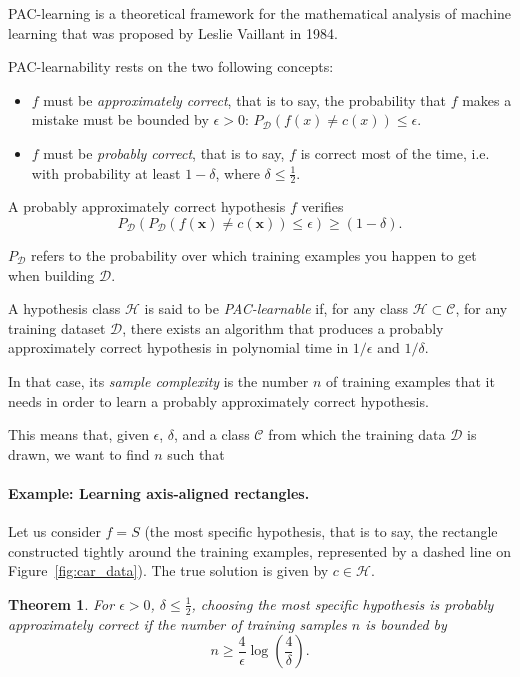 \documentclass[a4paper,12pt]{article}
\newcommand{\cc}{\mathcal{C}}
\newcommand{\dd}{\mathcal{D}}
\newcommand{\hh}{\mathcal{H}}
\newcommand{\xx}{{\bm x}}
\newtheorem*{thm}{Theorem}
\begin{document}
PAC-learning is a theoretical framework for the mathematical analysis of machine learning that was proposed by Leslie Vaillant in 1984. 

PAC-learnability rests on the two following concepts:
\begin{itemize}
\item $f$ must be {\em approximately correct}, that is to say, the probability that $f$ makes a mistake must be bounded by $\epsilon > 0$: 
$P_{\dd}(f(x) \neq c(x)) \leq \epsilon$.
\item $f$ must be {\em probably correct}, that is to say, $f$ is correct most of the time, i.e. with probability at least $1-\delta$, where $\delta \leq \frac{1}{2}$. 
\end{itemize}
A probably approximately correct hypothesis $f$ verifies
\[
P_{\dd}\left(
P_{\dd}(f(\xx) \neq c(\xx))
\leq \epsilon \right) \geq (1 - \delta).
\]

$P_\dd$ refers to the probability over which training examples you happen to get when building $\dd$.



A hypothesis class $\hh$ is said to be {\em PAC-learnable} if, for any class $\hh \subset \cc$, for any training dataset $\dd$, there exists an algorithm that produces a probably approximately correct hypothesis in polynomial time in $1/\epsilon$ and $1/\delta$.

In that case, its {\em sample complexity} is the number $n$ of training examples that it needs in order to learn a probably approximately correct hypothesis. 

This means that, given $\epsilon$, $\delta$, and a class $\cc$ from which the training data $\dd$ is drawn, we want to find $n$ such that 

\paragraph{Example: Learning axis-aligned rectangles.}
Let us consider $f = S$ (the most specific hypothesis, that is to say, the rectangle constructed tightly around the training examples, represented by a dashed line on Figure~\ref{fig:car_data}). The true solution is given by $c \in \hh$. 

\begin{thm}
For $\epsilon > 0$, $\delta \leq \frac{1}{2}$, choosing the most specific hypothesis is probably approximately correct if the number of training samples $n$ is bounded by 
\[
n \geq \frac{4}{\epsilon} \log\left( \frac{4}{\delta} \right).
\]
\end{thm}
\end{document}
